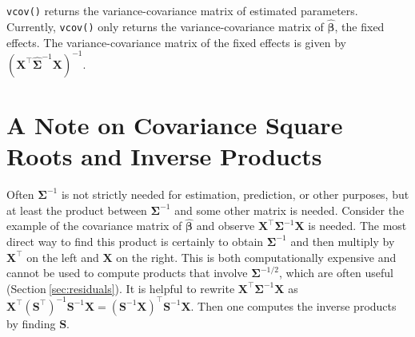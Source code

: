 \documentclass[10pt,letterpaper]{article}
\begin{document}
\texttt{vcov()} returns the variance-covariance matrix of estimated
parameters. Currently, \texttt{vcov()} only returns the
variance-covariance matrix of \(\hat{\boldsymbol{\beta}}\), the fixed
effects. The variance-covariance matrix of the fixed effects is given by
\((\mathbf{X}^\top \hat{\boldsymbol{\Sigma}}^{-1} \mathbf{X})^{-1}\).

\hypertarget{sec:iprod}{%
\section{A Note on Covariance Square Roots and Inverse
Products}\label{sec:iprod}}

Often \(\boldsymbol{\Sigma}^{-1}\) is not strictly needed for
estimation, prediction, or other purposes, but at least the product
between \(\boldsymbol{\Sigma}^{-1}\) and some other matrix is needed.
Consider the example of the covariance matrix of
\(\hat{\boldsymbol{\beta}}\) and observe
\(\mathbf{X}^\top \boldsymbol{\Sigma}^{-1} \mathbf{X}\) is needed. The
most direct way to find this product is certainly to obtain
\(\boldsymbol{\Sigma}^{-1}\) and then multiply by \(\mathbf{X}^\top\) on
the left and \(\mathbf{X}\) on the right. This is both computationally
expensive and cannot be used to compute products that involve
\(\boldsymbol{\Sigma}^{-1/2}\), which are often useful
(Section\(~\)\ref{sec:residuals}). It is helpful to rewrite
\(\mathbf{X}^\top \boldsymbol{\Sigma}^{-1} \mathbf{X}\) as
\(\mathbf{X}^\top (\mathbf{S}^\top)^{-1} \mathbf{S}^{-1} \mathbf{X} = (\mathbf{S}^{-1} \mathbf{X})^\top \mathbf{S}^{-1} \mathbf{X}\).
Then one computes the inverse products by finding \(\mathbf{S}\).
\end{document}
